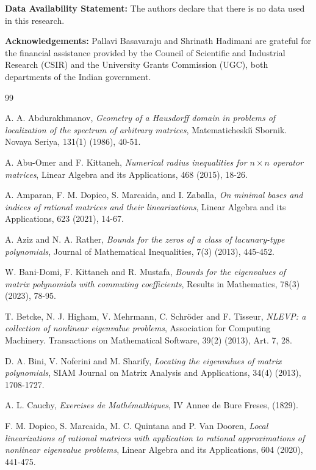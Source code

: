 \documentclass[12pt, reqno]{amsart}
\theoremstyle{definition}
\theoremstyle{remark}
\numberwithin{equation}{section}
\begin{document}
\noindent
{\bf Data Availability Statement:} The authors declare that there is no data used 
in this research.

\noindent
{\bf Acknowledgements:} Pallavi Basavaraju and Shrinath Hadimani are grateful for
the financial assistance provided by the Council of Scientific and Industrial 
Research (CSIR) and the University Grants Commission (UGC), both departments of the 
Indian government.


\begin{thebibliography}{99}

A. A. Abdurakhmanov, \emph{Geometry of a {H}ausdorff domain in problems of localization 
of the spectrum of arbitrary matrices}, Matematicheski\u{\i} Sbornik. Novaya Seriya, 
131(1) (1986), 40-51.

A. Abu-Omer and F. Kittaneh, \emph{Numerical radius inequalities for {$n\times n$} 
operator matrices}, Linear Algebra and its Applications, 468 (2015), 18-26.

A. Amparan, F. M. Dopico, S. Marcaida, and I. Zaballa, \emph{On minimal bases and indices 
of rational matrices and their linearizations}, Linear Algebra and its Applications, 
623 (2021), 14-67.

A. Aziz and N. A. Rather, \emph{Bounds for the zeros of a class of lacunary-type polynomials}, 
Journal of Mathematical Inequalities, 7(3) (2013), 445-452.

W. Bani-Domi, F. Kittaneh and R. Mustafa, \emph{Bounds for the eigenvalues of 
matrix polynomials with commuting coefficients},  Results in Mathematics, 
78(3) (2023), 78-95.

T. Betcke, N. J. Higham, V. Mehrmann, C. Schr\"{o}der and F. Tisseur, \emph{N{LEVP}: a 
collection of nonlinear eigenvalue problems}, Association for Computing Machinery. 
Transactions on Mathematical Software, 39(2) (2013), Art. 7, 28.

D. A. Bini, V. Noferini and M. Sharify, \emph{Locating the eigenvalues of matrix polynomials}, 
SIAM Journal on Matrix Analysis and Applications, 34(4) (2013), 1708-1727.

A. L. Cauchy, \emph{Exercises de Math\'emathiques}, IV Annee de Bure Freses, (1829).

F. M. Dopico, S. Marcaida, M. C. Quintana and P. Van Dooren, \emph{Local linearizations 
of rational matrices with application to rational approximations of nonlinear eigenvalue 
problems}, Linear Algebra and its Applications, 604 (2020), 441-475.


\end{thebibliography}
\end{document}
